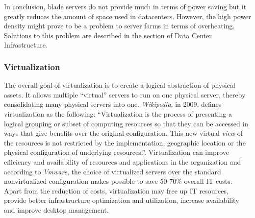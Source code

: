             In conclusion, blade servers do not provide much in terms of power saving but it greatly reduces the amount of space used in datacenters. However, the high power density might prove to be a problem to server farms in terms of overheating. Solutions to this problem are described in the section of Data Center Infrastructure.
            
            \subsubsection*{Virtualization}
                The overall goal of virtualization is to create a logical abstraction of physical assets. It allows multiple ``virtual'' servers to run on one physical server, thereby consolidating many physical servers into one. \emph{Wikipedia}, in 2009, defines virtualization as the following: ``Virtualization is the process of presenting a logical grouping or subset of computing resources so that they can be accessed in ways that give benefits over the original configuration. This new virtual \emph{view} of the resources is not restricted by the implementation, geographic location or the physical configuration of underlying resources.''. Virtualization can improve efficiency and availability of resources and applications in the organization and according to \emph{Vmware}, the choice of virtualized servers over the standard nonvirtualized configuration makes possible to save 50-70\% overall IT costs. Apart from the reduction of costs, virtualization may free up IT resources, provide better infrastructure optimization and utilization, increase availability and improve desktop management.
                
